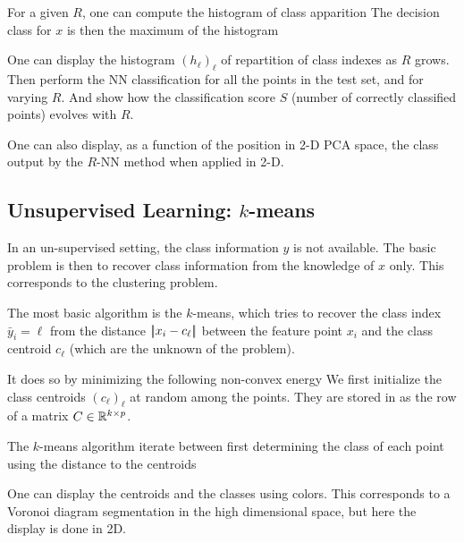 For a given $R$, one can compute the histogram of class apparition
The decision class for $x$ is then the maximum of the histogram

One can display the histogram $(h_\ell)_\ell$ of repartition of class indexes as $R$ grows.
% 
Then perform the NN classification for all the points in the test set, and for varying $R$.
And show how the classification score $S$ (number of correctly classified points)
evolves with $R$.



One can also display, as a function of the position in 2-D PCA space, the class output by 
the $R$-NN method when applied in 2-D.




\subsection{Unsupervised Learning: $k$-means}

In an un-supervised setting, the class information $y$ is not
available. The basic problem is then to recover class information from
the knowledge of $x$ only. This corresponds to the clustering problem.



The most basic algorithm is the $k$-means, which tries to recover the
class index $\bar y_i=\ell$ from the distance $ |\!| x_i-c_\ell |\!| $
between the feature point $x_i$ and the class centroid $c_\ell$
(which are the unknown of the problem). 

It does so by minimizing the following non-convex energy
We first initialize the class centroids $ (c_\ell)_\ell $ at random among the points.
They are stored in as the row of a matrix $ C \in \mathbb{R}^{k \times p} $.


The $k$-means algorithm iterate between first determining the class of
each point using the distance to the centroids

One can display the centroids and the classes using colors.
This corresponds to a Voronoi diagram segmentation in the high
dimensional space, but here the display is done in 2D.

